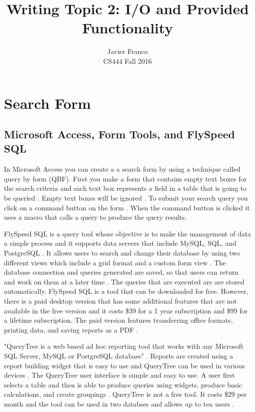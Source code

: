 \documentclass[12pt, draftclsnofoot, onecolumn]{IEEEtran}
\begin{document}
	\title{Writing Topic 2: I/O and Provided Functionality}
	\author{
		Javier Franco \\
		\endgraf
		CS444 Fall 2016
	}
	\maketitle
	
	\pagebreak

\section{Search Form}
\subsection{Microsoft Access, Form Tools, and FlySpeed SQL}
In Microsoft Access you can create a a search form by using a technique called query by form (QBF). First you make a form that contains empty text boxes for the search criteria and each text box represents a field in a table that is going to be queried \cite{Micro}. Empty text boxes will be ignored \cite{Micro}. To submit your search query you click on a command button on the form \cite{Micro}. When the command button is clicked it uses a macro that calls a query to produce the query results. 

FlySpeed SQL is a query tool whose objective is to make the management of data a simple process and it supports data servers that include MySQL, SQL, and PostgreSQL \cite{Andrew}. It allows users to search and change their database by using two different views which include a grid format and a custom form view \cite{Andrew}.  The database connection and queries generated are saved, so that users can return and work on them at a later time \cite{Fly}. The queries that are executed are are stored automatically\cite{Fly}. FlySpeed SQL is a tool that can be downloaded for free. However, there is a paid desktop version that has some additional features that are not available in the free version and it costs \$39 for a 1 year subscription and \$99 for a lifetime subscription. The paid version features transferring office formats, printing data, and saving reports as a PDF \cite{Fly}. 

"QueryTree is a web based ad hoc reporting tool that works with any Microsoft SQL Server, MySQL or PostgreSQL database" \cite{QueryTree}. Reports are created using a report building widget that is easy to use and QueryTree can be used in various devices \cite{QueryTree}. The QueryTree user interface is simple and easy to use. A user first selects a table and then is able to produce queries using widgets, produce basic calculations, and create groupings \cite{QueryTree}. QueryTree is not a free tool. It costs \$29 per month and the tool can be used in two databses and allows up to ten users \cite{QueryTree}. 
\end{document}
